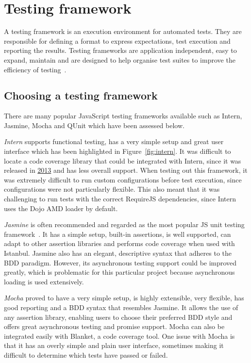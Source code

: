 \section{Testing framework} {
\label{sec:testing_framework}

	A testing framework is an execution environment for automated tests. They are responsible for defining a format to express expectations, test execution and reporting the results. Testing frameworks are application independent, easy to expand, maintain and are designed to help organise test suites to improve the efficiency of testing~\parencite{ghanakota2012testing}.

	\subsection{Choosing a testing framework} {
	\label{sec:choosing_a_testing_framework}

		There are many popular JavaScript testing frameworks available such as Intern, Jasmine, Mocha and QUnit which have been assessed below.

		\emph{Intern} supports functional testing, has a very simple setup and great user interface which has been highlighted in Figure~\ref{fig:intern}. It was difficult to locate a code coverage library that could be integrated with Intern, since it was released in \href{https://github.com/theintern}{2013} and has less overall support. When testing out this framework, it was extremely difficult to run custom configurations before test execution, since configurations were not particularly flexible. This also meant that it was challenging to run tests with the correct RequireJS dependencies, since Intern uses the Dojo AMD loader by default.

		

		\emph{Jasmine} is often recommended and regarded as the most popular JS unit testing framework~\parencite{feldman2014testing}. It has a simple setup, built-in assertions, is well supported, can adapt to other assertion libraries and performs code coverage when used with Istanbul. Jasmine also has an elegant, descriptive syntax that adheres to the BDD paradigm. However, its asynchronous testing support could be improved greatly, which is problematic for this particular project because asynchronous loading is used extensively.

		\emph{Mocha} proved to have a very simple setup, is highly extensible, very flexible, has good reporting and a BDD syntax that resembles Jasmine. It allows the use of any assertion library, enabling users to choose their preferred BDD style and offers great asynchronous testing and promise support. Mocha can also be integrated easily with Blanket, a code coverage tool. One issue with Mocha is that it has an overly simple and plain user interface, sometimes making it difficult to determine which tests have passed or failed.

}}

